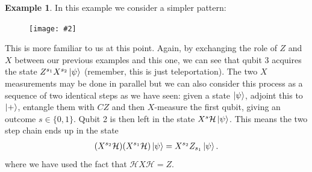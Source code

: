 \documentclass{book}
\theoremstyle{definition}
\newtheorem{exmp}{Example}[section]
\newcommand{\had}{\mathcal{H}}
\newcommand{\fig}[2]{
	\begin{figure}[!htb]
		\centering
		\texttt{[image: \#2]}
	\end{figure}}
\begin{document}
\begin{exmp}
	In this example we consider a simpler pattern:
	
	\fig{0.3}{fig6}
	
	This is more familiar to us at this point. Again, by exchanging the role of $Z$ and $X$ between our previous examples and this one, we can see that qubit 3 acquires the state $Z^{s_1}X^{s_2}\ket{\psi}$ (remember, this is just teleportation). The two $X$ measurements may be done in parallel but we can also consider this process as a sequence of two identical steps as we have seen: given a state $\ket{\psi}$, adjoint this to $\ket{+}$, entangle them with $CZ$ and then $X$-measure the first qubit, giving an outcome $s \in \{0,1\}$. Qubit 2 is then left in the state $X^s \had \ket{\psi}$. This means the two step chain ends up in the state
	\begin{align}
	(X^{s_2}\had )(X^{s_1}\had)\ket{\psi} = X^{s_2}Z_{s_1}\ket{\psi}.
	\end{align} 
	where we have used the fact that $\had X \had  = Z$. 
\end{exmp}
\end{document}
